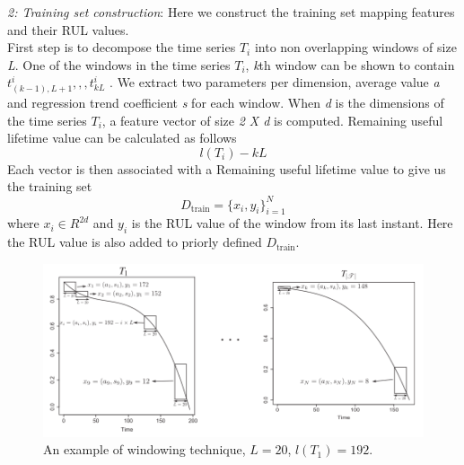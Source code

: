 \textit{2: Training set construction}: Here we construct the training set mapping features and their RUL values.\\
First step is to decompose the time series $T_{i}$ into non overlapping windows of size \textit{L}. One of the windows in the time series $T_{i}$, \textit{k}th window can be shown to contain $t^{i}_{(k-1),L+1},,,t^{i}_{kL}$ \cite{DBLP:journals/tie/KhelifCMLFZ17}.
We extract two parameters per dimension, average value \textit{a} and regression trend coefficient \textit{s} for each window. When \textit{d} is the dimensions of the time series $T_{i}$, a feature vector of size \textit{2 X d} is computed. Remaining useful lifetime value can be calculated as follows $$l(T_i) - kL$$
Each vector is then associated with a Remaining useful lifetime value to give us the training set $$D_\text{train} = \{x_i, y_i\}_{i=1}^{N}$$ where \textit{$x_i$}$\in R^{2d}$ and \textit{$y_i$} is the RUL value of the window from its last instant. Here the RUL value is also added to priorly defined $D_\text{train}$.
\begin{figure}[ht]
    \includegraphics[width=\textwidth]{gfx/rul_trendfeats}
    \caption{An example of windowing technique, $L = 20$, $l(T_{1}) = 192$. \cite{DBLP:journals/tie/KhelifCMLFZ17}}
    \label{fig:trendfeats_rul}
\end{figure}

